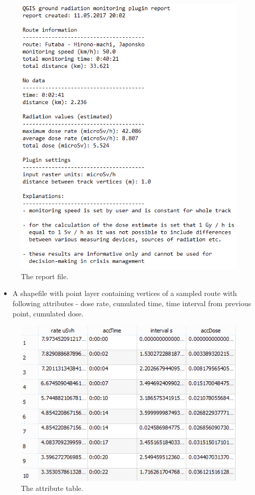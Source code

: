 \begin{figure}[H]
\centering
\includegraphics{pictures/user_guide/report.png}
\caption{The report file.}
\end{figure}

\begin{itemize}

\item
  A shapefile with point layer containing vertices of a sampled route with
  following attributes - dose rate, cumulated time, time interval from
  previous point, cumulated dose.
\end{itemize}

\begin{figure}[H]
\centering
\includegraphics{pictures/user_guide/shapefile.png}
\caption{The attribute table.}
\end{figure}

